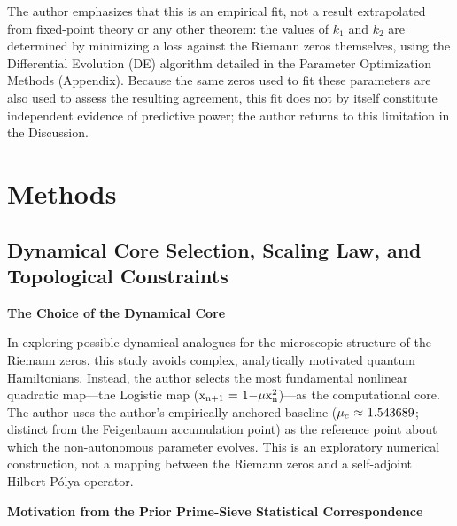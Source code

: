 \documentclass[mca,article,submit,oneauthor,pdftex]{Definitions/mdpi}
\begin{document}
The author emphasizes that this is an empirical fit, not a result extrapolated from
fixed-point theory or any other theorem: the values of
\({k}_{\text{1}}\) and \({k}_{\text{2}}\)
are determined
by minimizing a loss against the Riemann zeros themselves, using the
Differential Evolution (DE) algorithm
detailed in the Parameter Optimization Methods (Appendix). Because the
same zeros used to fit these parameters are also used to assess the
resulting agreement, this fit does not by itself constitute independent
evidence of predictive power; the author returns to this limitation in the
Discussion.

\section{Methods}

\subsection{Dynamical Core Selection, Scaling Law, and Topological Constraints}

\textbf{The Choice of the Dynamical Core}

In exploring possible dynamical analogues for the microscopic structure of
the Riemann zeros, this study
avoids complex, analytically motivated quantum Hamiltonians. Instead, the author selects the most fundamental nonlinear quadratic map---the Logistic map
(\(\text{x}_{\text{n}\text{+1}}~\text{=~1\ensuremath{-}}\text{\ensuremath{\mu}}\text{x}_{\text{n}}^{\text{2}}\))---as
the computational core. The author uses the author's empirically anchored baseline
(\(\mu_c~\text{\ensuremath{\approx}~1.543689}\); distinct from the Feigenbaum
accumulation point) as the reference point about which the non-autonomous
parameter evolves. This is an exploratory numerical construction, not a
mapping between the Riemann zeros and a self-adjoint Hilbert-P\'olya
operator.

\textbf{Motivation from the Prior Prime-Sieve Statistical Correspondence}\label{sec:prime-motivation}
\end{document}
